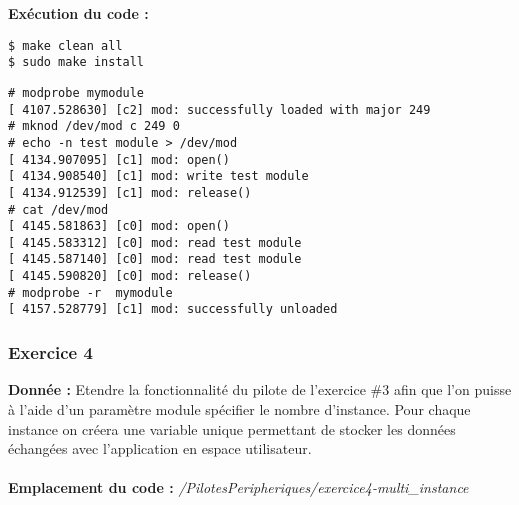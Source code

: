 \textbf{Exécution du code : } \\
\begin{lstlisting}
$ make clean all
$ sudo make install
\end{lstlisting}
\begin{lstlisting}
# modprobe mymodule                                                             
[ 4107.528630] [c2] mod: successfully loaded with major 249                     
# mknod /dev/mod c 249 0                                                        
# echo -n test module > /dev/mod                                                
[ 4134.907095] [c1] mod: open()                                                 
[ 4134.908540] [c1] mod: write test module                                      
[ 4134.912539] [c1] mod: release()                                              
# cat /dev/mod                                                                  
[ 4145.581863] [c0] mod: open()                                                 
[ 4145.583312] [c0] mod: read test module                                       
[ 4145.587140] [c0] mod: read test module                                       
[ 4145.590820] [c0] mod: release()                                              
# modprobe -r  mymodule                                                         
[ 4157.528779] [c1] mod: successfully unloaded   
\end{lstlisting}

\subsubsection{Exercice 4}
\textbf{Donnée : } Etendre	la	fonctionnalité	du	pilote	de	l’exercice	\#3 afin	que	l’on	puisse	à	l’aide	d’un	paramètre	
module	spécifier	le	nombre	d’instance.	Pour	chaque	instance	on	créera	une	variable	unique	
permettant	de	stocker	les	données	échangées	avec	l’application	en	espace	utilisateur.\\\\
\textbf{Emplacement du code : } \textit{/PilotesPeripheriques/exercice4-multi\_instance}\\

